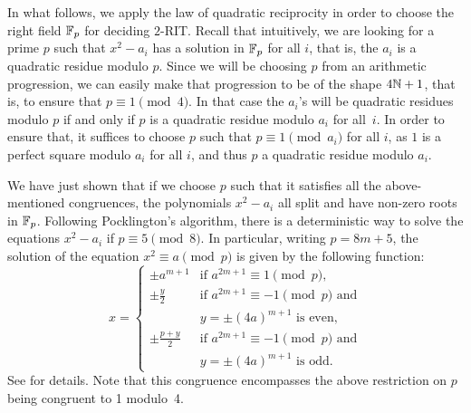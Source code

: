 In what follows, we apply the law of quadratic reciprocity in order to choose the right field $\mathbb{F}_p$ for deciding $2$-RIT. Recall that intuitively, we are looking for a prime $p$ such that $x^2-a_i$ has a solution in $\mathbb{F}_p$ for all $i$, that is, the $a_i$ is a quadratic residue modulo $p$. Since we will be choosing $p$ from an arithmetic progression, we can easily make that progression to be of the shape $4\mathbb{N} + 1$, that is, to ensure that $p\equiv 1 \pmod{4}$. In that case the $a_i$'s will be quadratic residues modulo $p$ if and only if $p$ is a quadratic residue modulo $a_i$ for all~$i$. In order to ensure that, it suffices to choose $p$ such that $p \equiv 1 \pmod{a_i}$ for all $i$, as $1$ is a perfect square modulo $a_i$ for all $i$, and thus $p$ a quadratic residue modulo $a_i$.

We have just shown that if we choose $p$ such that it satisfies all the above-mentioned congruences, the polynomials $x^{2}-a_i$ all split and have non-zero roots in $\mathbb{F}_p$. Following Pocklington's algorithm, there is a deterministic way to solve the equations $x^2-a_i$  if $p\equiv 5 \pmod{8}$. 
In particular, writing $p = 8m+5$, the solution of the equation $x^2 \equiv a \pmod{p}$ is given by the following function:
\begin{equation}\label{eq:pocklington}
x =\begin{cases}
\pm a^{m+1} & \text{if $a^{2m+1} \equiv 1 \pmod{p}$,}\\
\pm\frac{y}{2} &\text{if $a^{2m+1} \equiv -1 \pmod{p}$ and} \\
& \text{$y = \pm(4a)^{m+1}$ is even,} \\ 
\pm\frac{p+y}{2} &\text{if $a^{2m+1} \equiv -1 \pmod{p}$ and} \\
& \text{$y = \pm(4a)^{m+1}$ is odd.}
\end{cases}
\end{equation}
See  for details.
Note that this congruence encompasses the above restriction on $p$ being congruent to 1 modulo~4.


